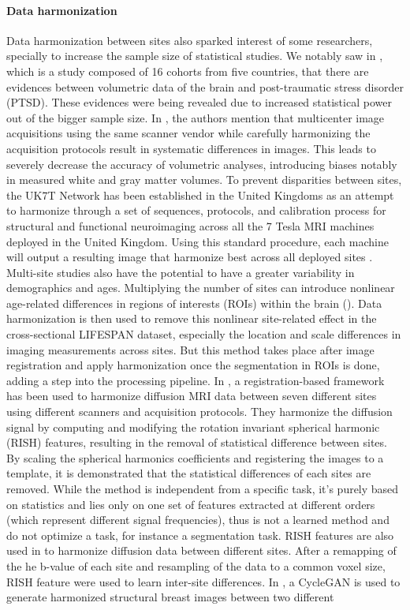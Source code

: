 \documentclass[preprint,12pt]{elsarticle}
\begin{document}
\paragraph{Data harmonization}
Data harmonization between sites also sparked interest of some researchers, specially to increase the sample size of statistical studies. We notably saw in \cite{LOGUE2018244}, which is a study composed of 16 cohorts from five countries, that there are evidences between volumetric data of the brain and post-traumatic stress disorder (PTSD). These evidences were being revealed due to increased statistical power out of the bigger sample size. In \cite{Shinohara2017}, the authors mention that multicenter image acquisitions using the same scanner vendor while carefully harmonizing the acquisition protocols result in systematic differences in images. This leads to severely decrease the accuracy of volumetric analyses, introducing biases notably in measured white and gray matter volumes. To prevent disparities between sites, the UK7T Network has been established in the United Kingdoms as an attempt to harmonize through a set of sequences, protocols, and calibration process for structural and functional neuroimaging across all the 7 Tesla MRI machines deployed in the United Kingdom. Using this standard procedure, each machine will output a resulting image that harmonize best across all deployed sites \cite{clarke2020multi}. Multi-site studies also have the potential to have a greater variability in demographics and ages. Multiplying the number of sites can introduce nonlinear age-related differences in regions of interests (ROIs) within the brain (\cite{pomponio2020harmonization}). Data harmonization is then used to remove this nonlinear site-related effect in the cross-sectional LIFESPAN dataset, especially the location and scale differences in imaging measurements across sites. But this method takes place after image registration and apply harmonization once the segmentation in ROIs is done, adding a step into the processing pipeline. In \cite{mirzaalian2018multi}, a registration-based framework has been used to harmonize diffusion MRI data between seven different sites using different scanners and acquisition protocols. They harmonize the diffusion signal by computing and modifying the rotation invariant spherical harmonic (RISH) features, resulting in the removal of statistical difference between sites. By scaling the spherical harmonics coefficients and registering the images to a template, it is demonstrated that the statistical differences of each sites are removed. While the method is independent from a specific task, it's purely based on statistics and lies only on one set of features extracted at different orders (which represent different signal frequencies), thus is not a learned method and do not optimize a task, for instance a segmentation task. RISH features are also used in \citet{karayumak2019retrospective} to harmonize diffusion data between different sites. After a remapping of the he b-value of each site and resampling of the data to a common voxel size, RISH feature were used to learn inter-site differences. In \cite{modanwal2020mri}, a CycleGAN is used to generate harmonized structural breast images between two different 
\end{document}

